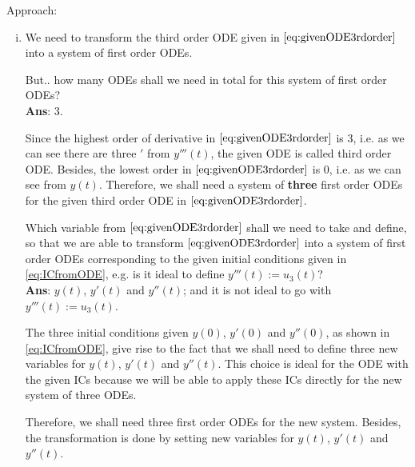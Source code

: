 \documentclass[12pt]{article}
\begin{document}
Approach:
\begin{enumerate}[i)]
	\item We need to transform the third order ODE
	      given in $\eqref{eq:givenODE3rdorder}$
	      into a system of first order ODEs.
	      \begin{questionboxed} 
		      But.. how many ODEs shall we need in total 
		      for this system of first order ODEs?\\ 
		      \textbf{Ans}: 3.
	      \end{questionboxed}
	      \begin{observationboxed}
		      Since the highest order of derivative in 
		      $\eqref{eq:givenODE3rdorder}$ is 3, 
		      i.e. as we can see there are three $'$ from $y'''(t)$,
		      the given ODE is called third order ODE.
		      Besides, the lowest order in 
		      $\eqref{eq:givenODE3rdorder}$ is 0, 
		      i.e. as we can see from $y(t)$.
		      Therefore, we shall need
		      a system of \textbf{three} first order ODEs
		      for the given third order ODE in 
		      $\eqref{eq:givenODE3rdorder}$.
	      \end{observationboxed}
	      \begin{questionboxed} 
		      Which variable from $\eqref{eq:givenODE3rdorder}$
		      shall we need to take and define,
		      so that we are able to transform 
		      $\eqref{eq:givenODE3rdorder}$
		      into a system of first order ODEs
		      corresponding to 
		      the given initial conditions given in 
		      \eqref{eq:ICfromODE}, 
		      e.g. is it ideal to define $y'''(t) := u_{3}(t)$?\\
		      \textbf{Ans}: $y(t)$, $y'(t)$ and $y''(t)$; 
		      and it is not ideal to go with 
		      $y'''(t) := u_{3}(t)$.
	      \end{questionboxed}
	      \begin{observationboxed}
		      The three initial conditions given
		      $y(0)$, $y'(0)$ and $y''(0)$, 
		      as shown in \eqref{eq:ICfromODE},
		      give rise to the fact that 
		      we shall need to define three new variables
		      for $y(t)$, $y'(t)$ and $y''(t)$.
		      This choice is ideal for the ODE with 
		      the given ICs
		      because we will be able to apply
		      these ICs directly for the new system of
		      three ODEs.
	      \end{observationboxed}
	      
	      Therefore, we shall need three first order ODEs 
	      for the new system. Besides, 
	      the transformation is done by setting 
	      new variables for $y(t)$, $y'(t)$ and $y''(t)$.
	      

\end{enumerate}
\end{document}
